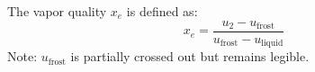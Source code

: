 The vapor quality \( x_e \) is defined as:  
\[
x_e = \frac{u_2 - u_{\text{frost}}}{u_{\text{frost}} - u_{\text{liquid}}}
\]  
Note: \( u_{\text{frost}} \) is partially crossed out but remains legible.